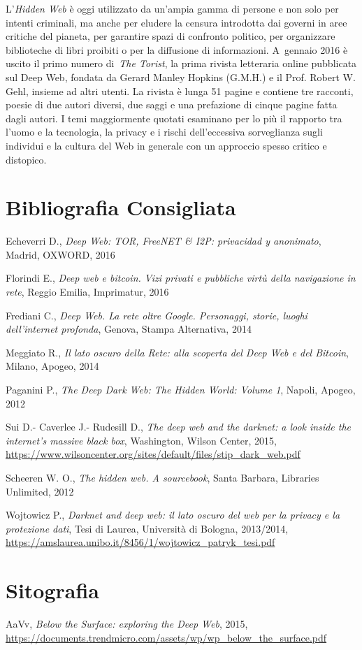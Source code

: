{{L'\emph{Hidden Web} è oggi utilizzato da un'ampia gamma di persone e non
solo per intenti criminali, ma anche per eludere la censura introdotta
dai governi in aree critiche del pianeta, per garantire spazi di
confronto politico, per organizzare biblioteche di libri proibiti o per
la diffusione di informazioni. A~gennaio 2016 è uscito il primo numero
di~\emph{The Torist}, la prima rivista letteraria online pubblicata sul
Deep Web, fondata da Gerard Manley Hopkins (G.M.H.) e il Prof. Robert W.
Gehl, insieme ad altri utenti. La rivista è lunga 51 pagine e contiene
tre racconti, poesie di due autori diversi, due saggi e una prefazione
di cinque pagine fatta dagli autori. I temi maggiormente quotati
esaminano per lo più il rapporto tra l'uomo e la tecnologia, la privacy
e i rischi dell'eccessiva sorveglianza sugli individui e la cultura del
Web in generale con un approccio spesso critico e distopico.

\section*{Bibliografia Consigliata}
{\parindent0pt 
Echeverri D., \emph{Deep Web: TOR, FreeNET \& I2P: privacidad y
anonimato}, Madrid, OXWORD, 2016

Florindi E., \emph{Deep web e bitcoin. Vizi privati e pubbliche virtù
della navigazione in rete}, Reggio Emilia, Imprimatur, 2016

Frediani C., \emph{Deep Web. La rete oltre Google. Personaggi, storie,
luoghi dell'internet profonda}, Genova, Stampa Alternativa, 2014

Meggiato R., \emph{Il lato oscuro della Rete: alla scoperta del Deep Web
e del Bitcoin}, Milano, Apogeo, 2014

Paganini P., \emph{The Deep Dark Web: The Hidden World: Volume 1},
Napoli, Apogeo, 2012

Sui D.- Caverlee J.- Rudesill D., \emph{The deep web and the darknet: a
look inside the internet's massive black box}, Washington, Wilson
Center, 2015,
\url{https://www.wilsoncenter.org/sites/default/files/stip_dark_web.pdf}

Scheeren W. O., \emph{The hidden web. A sourcebook}, Santa Barbara,
Libraries Unlimited, 2012

Wojtowicz P., \emph{Darknet and deep web: il lato oscuro del web per la
privacy e la protezione dati}, Tesi di Laurea, Università di Bologna,
2013/2014,
\url{https://amslaurea.unibo.it/8456/1/wojtowicz_patryk_tesi.pdf}
}

\section*{Sitografia}
{\parindent0pt 
AaVv, \emph{Below the Surface: exploring the Deep Web}, 2015,
\url{https://documents.trendmicro.com/assets/wp/wp_below_the_surface.pdf}

}}}

